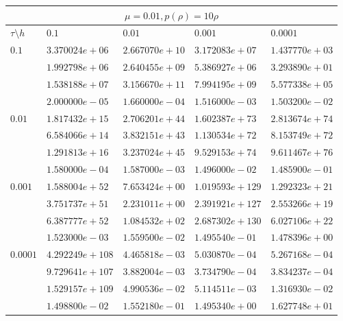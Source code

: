 \documentclass[12pt,a4paper]{article}
\begin{document}
\begin{tabular}{ |l|l|l|l|l| }
    \hline
    \multicolumn{5}{|c|}{$\mu = 0.01, p(\rho)  = 10\rho$}\\
    \hline
    $\tau\setminus h$ & $0.1$ & $0.01$ & $0.001$ & $0.0001$\\
    \hline
    $0.1$ & $3.370024e+06$ & $2.667070e+10$ & $3.172083e+07$ & $1.437770e+03$ \\
    & $1.992798e+06$ & $2.640455e+09$ & $5.386927e+06$ & $3.293890e+01$ \\
    & $1.538188e+07$ & $3.156670e+11$ & $7.994195e+09$ & $5.577338e+05$ \\
    & $2.000000e-05$ & $1.660000e-04$ & $1.516000e-03$ & $1.503200e-02$ \\
    \hline
    $0.01$ & $1.817432e+15$ & $2.706201e+44$ & $1.602387e+73$ & $2.813674e+74$ \\
    & $6.584066e+14$ & $3.832151e+43$ & $1.130534e+72$ & $8.153749e+72$ \\
    & $1.291813e+16$ & $3.237024e+45$ & $9.529153e+74$ & $9.611467e+76$ \\
    & $1.580000e-04$ & $1.587000e-03$ & $1.496000e-02$ & $1.485900e-01$ \\
    \hline
    $0.001$ & $1.588004e+52$ & $7.653424e+00$ & $1.019593e+129$ & $1.292323e+21$ \\
    & $3.751737e+51$ & $2.231011e+00$ & $2.391921e+127$ & $2.553266e+19$ \\
    & $6.387777e+52$ & $1.084532e+02$ & $2.687302e+130$ & $6.027106e+22$ \\
    & $1.523000e-03$ & $1.559500e-02$ & $1.495540e-01$ & $1.478396e+00$ \\
    \hline
    $0.0001$ & $4.292249e+108$ & $4.465818e-03$ & $5.030870e-04$ & $5.267168e-04$ \\
    & $9.729641e+107$ & $3.882004e-03$ & $3.734790e-04$ & $3.834237e-04$ \\
    & $1.529157e+109$ & $4.990536e-02$ & $5.114511e-03$ & $1.316930e-02$ \\
    & $1.498800e-02$ & $1.552180e-01$ & $1.495340e+00$ & $1.627748e+01$ \\
    \hline
\end{tabular}
\end{document}

